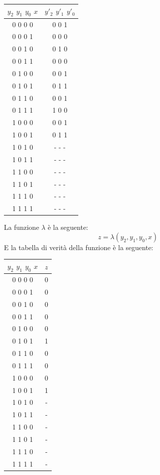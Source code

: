 \documentclass[a4paper]{article}
\theoremstyle{break}
\theoremstyle{break}
\theoremstyle{break}
\theoremstyle{break}
\begin{document}
\begin{table}[H]
  \begin{center}
    \begin{tabular}{c|c}
      \( y_2 \) \( y_1 \) \( y_0 \) \( x \)  & \( y'_2 \) \( y'_1 \) \( y'_0 \)    \\
      \hline
      0 0 0 0 & 0 0 1 \\
      0 0 0 1 & 0 0 0 \\
      0 0 1 0 & 0 1 0 \\
      0 0 1 1 & 0 0 0 \\
      0 1 0 0 & 0 0 1 \\
      0 1 0 1 & 0 1 1 \\
      0 1 1 0 & 0 0 1 \\
      0 1 1 1 & 1 0 0 \\
      1 0 0 0 & 0 0 1 \\
      1 0 0 1 & 0 1 1 \\
      1 0 1 0 & - - - \\
      1 0 1 1 & - - - \\
      1 1 0 0 & - - - \\
      1 1 0 1 & - - - \\
      1 1 1 0 & - - - \\
      1 1 1 1 & - - - \\
    \end{tabular}
  \end{center}
\end{table}
La funzione \( \lambda \) è la seguente:
\[
z = \lambda (y_2, y_1, y_0, x)
\] 
E la tabella di verità della funzione è la seguente:
\begin{table}[H]
  \begin{center}
    \begin{tabular}{c|c}
      \( y_2 \) \( y_1 \) \( y_0 \) \( x \)  & \( z \)     \\
      \hline
      0 0 0 0 & 0 \\
      0 0 0 1 & 0 \\
      0 0 1 0 & 0 \\
      0 0 1 1 & 0 \\
      0 1 0 0 & 0 \\
      0 1 0 1 & 1 \\
      0 1 1 0 & 0 \\
      0 1 1 1 & 0 \\
      1 0 0 0 & 0 \\
      1 0 0 1 & 1 \\
      1 0 1 0 & - \\
      1 0 1 1 & - \\
      1 1 0 0 & - \\
      1 1 0 1 & - \\
      1 1 1 0 & - \\
      1 1 1 1 & - \\
    \end{tabular}
  \end{center}
\end{table}
\end{document}
